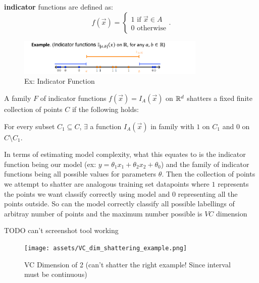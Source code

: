 \documentclass[a4paper]{article}
\begin{document}
\begin{definition}
 \textbf{indicator} functions are defined as:
  \[
    f(\vec{x}) = \begin{cases}
      1 \text{  if $\vec{x} \in A$} \\ 
      0 \text{  otherwise}
    \end{cases}
  .\] 
   
\begin{figure}[H]
  \centering
  \includegraphics[width=0.8\textwidth]{assets/indicator_function_example.png}
  \caption{Ex: Indicator Function}
  \label{fig:indicator_function_example}
\end{figure}
\end{definition}

\begin{definition}
  A family $F$ of indicator functions  $f\left( \vec{x} \right) = I_A (\vec{x}) $ on $\mathbb{R}^{d}$ shatters
  a fixed finite collection of points $C$ if the  following holds:

  For every subset $C_1 \subseteq C$,  $\exists$ a function  $I_{A} (\vec{x})$ in family with $1$ on 
   $C_1$ and  $0$ on  $C \setminus C_1$.

  In terms of estimating model complexity, what this equates to is the indicator function being our model
  (ex: $y = \theta_1 x_1 + \theta_2 x_2 + \theta_0$) and the family of indicator functions being
  all possible values for parameters  $\theta$. Then the collection of points we attempt to shatter
  are analogous training set datapoints where $1$ represents the points we want classify correctly using model and $0$
  representing all the points outside. So can the model correctly classify all possible labellings of 
  arbitray number of points and the maximum number possible is $VC$ dimension
\end{definition}

TODO can't screenshot tool working 
\begin{figure}[h]
  \centering
  \texttt{[image: assets/VC\_dim\_shattering\_example.png]}
  \caption{VC Dimension of 2 (can't shatter the right example! Since interval must be continuous)}
  \label{fig:vc_dim_shattering_example}
\end{figure}
\end{document}
